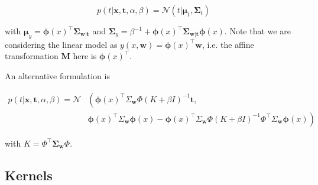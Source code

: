 \documentclass[11pt]{article} %
\begin{document}
\begin{equation}
   p(t | \mathbf{x}, \mathbf{t}, \alpha, \beta)=\mathcal{N}\left(t | \boldsymbol{\mu}_{t}, \boldsymbol{\Sigma}_{t} \right)
\end{equation}

with $\boldsymbol{\mu}_y = \boldsymbol{\phi}(x)^\top \boldsymbol{\Sigma}_{\mathbf{w} | \mathbf{t}}$ and $\boldsymbol{\Sigma}_y = \beta^{-1} + \boldsymbol{\phi}(x)^\top \boldsymbol{\Sigma}_{\mathbf{w} | \mathbf{t}}\boldsymbol{\phi}(x)$. Note that we are considering the linear model as $y(x,\mathbf{w}) = \boldsymbol{\phi}(x)^\top \mathbf{w}$, i.e. the affine transformation $\mathbf{M}$ here is $\boldsymbol{\phi}(x)^\top$.

An alternative formulation \cite{Rasmussen:2005:GPM:1162254} is

\begin{equation}
\begin{aligned}
      p(t | \mathbf{x}, \mathbf{t}, \alpha, \beta) = \mathcal{N} & \left(  \boldsymbol{\phi}(x)^{\top} \Sigma_\mathbf{w} \Phi\left(K+\beta I\right)^{-1} \mathbf{t} \right., \\ &\left.\boldsymbol{\phi}(x)^{\top} \Sigma_\mathbf{w} \boldsymbol{\phi}(x)-\boldsymbol{\phi}(x)^{\top} \Sigma_\mathbf{w} \Phi\left(K+\beta I\right)^{-1} \Phi^{\top} \Sigma_\mathbf{w} \boldsymbol{\phi}(x)\right)
\end{aligned}
\end{equation}

with $K=\Phi^{\top} \boldsymbol{\Sigma}_\mathbf{w} \Phi$.

\subsection{Kernels}
\end{document}
